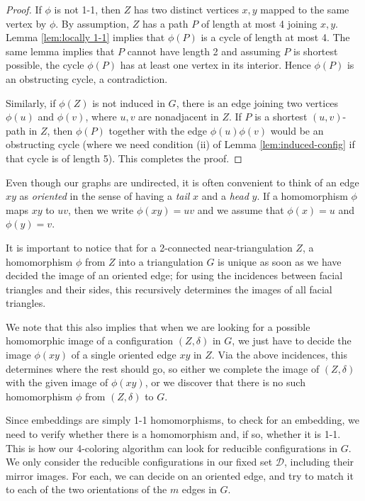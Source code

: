 \documentclass[10pt,a4paper]{article}
\def\cD{{\mathcal D}}
\begin{document}
\begin{proof}
  If $\phi$ is not 1-1, then $Z$ has two distinct vertices $x,y$ mapped to the same vertex by $\phi$. By assumption, $Z$ has a path $P$ of length at most 4 joining $x,y$. Lemma \ref{lem:locally 1-1} implies that $\phi(P)$ is a cycle of length at most 4. The same lemma implies that $P$ cannot have length 2 and assuming $P$ is shortest possible, the cycle $\phi(P)$ has at least one vertex in its interior. Hence $\phi(P)$ is an obstructing cycle, a contradiction.
 
  Similarly, if $\phi(Z)$ is not induced in $G$, there is an edge joining two vertices $\phi(u)$ and $\phi(v)$, where $u,v$ are nonadjacent in $Z$. If $P$ is a shortest $(u,v)$-path in $Z$, then $\phi(P)$ together with the edge $\phi(u)\phi(v)$ would be an obstructing cycle (where we need condition (ii) of Lemma \ref{lem:induced-config} if that cycle is of length 5). This completes the proof.
\end{proof}


Even though our graphs are undirected, it is often convenient to think of an edge $xy$ as \emph{oriented} in the sense of having a \emph{tail} $x$ and a \emph{head} $y$. If a homomorphism $\phi$ maps $xy$ to $uv$, then we write $\phi(xy)=uv$ and we assume that $\phi(x)=u$ and $\phi(y)=v$. 

It is important to notice that for a 2-connected near-triangulation $Z$, a homomorphism $\phi$ from $Z$ into a triangulation $G$ is unique as soon as we have decided the image of an oriented edge; for using the incidences between facial triangles and their sides, this recursively determines the images of all facial triangles.

We note that this also implies that when we are looking for a possible homomorphic image of a configuration $(Z,\delta)$ in $G$, we just have to decide the image $\phi(xy)$ of a single oriented edge $xy$ in $Z$. Via the above incidences, this determines where the rest should go, so either we complete the image of $(Z,\delta)$ with the given image of $\phi(xy)$, or we discover that there is no such homomorphism $\phi$ from $(Z,\delta)$ to $G$. 

Since embeddings are simply 1-1 homomorphisms, to check for an embedding, we need to verify whether there is a homomorphism and, if so, whether it is 1-1. This is how our 4-coloring algorithm can look for reducible configurations in $G$. We only consider the reducible configurations in our fixed set $\cD$, 
including their mirror images. For each, we can decide on an oriented edge, and try to match it to each of the two orientations of the $m$ edges in $G$.
\end{document}
